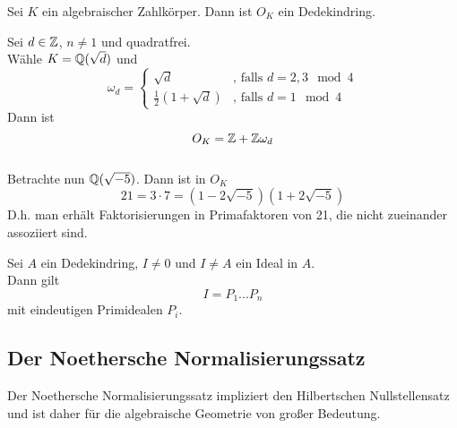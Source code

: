 	\begin{theorem}
		Sei $K$ ein algebraischer Zahlkörper. Dann ist $O_K$ ein Dedekindring.
	\end{theorem}

	\begin{exm}
		Sei $d\in\mathbb{Z}$, $n\neq 1$ und quadratfrei.\\
		Wähle $K=\mathbb{Q}(\sqrt{d})$ und
		\[\omega_d=\begin{cases}
		\sqrt d&\text{, falls $d=2,3\mod 4$}\\
		\frac{1}{2}(1+\sqrt{d})&\text{, falls $d=1\mod 4$}
		\end{cases}\]
		Dann ist
		\[O_K=\mathbb{Z}+\mathbb{Z}\omega_d\]
		\\
		Betrachte nun $\mathbb{Q}(\sqrt{-5})$. Dann ist in
		$O_K$
		\[21=3\cdot 7=(1-2\sqrt{-5})(1+2\sqrt{-5})\]
		D.h. man erhält Faktorisierungen in Primafaktoren von 21, die nicht zueinander assoziiert sind.
	\end{exm}

	\begin{theorem}
		Sei $A$ ein Dedekindring, $I\neq 0$ und $I\neq A$ ein Ideal in $A$.\\
		Dann gilt
		\[I=P_1...P_n\]
		mit eindeutigen Primidealen $P_i$.
	\end{theorem}



	\subsection{Der Noethersche Normalisierungssatz}
	Der Noethersche Normalisierungssatz impliziert den Hilbertschen Nullstellensatz und ist daher für die algebraische Geometrie von großer Bedeutung.
	
